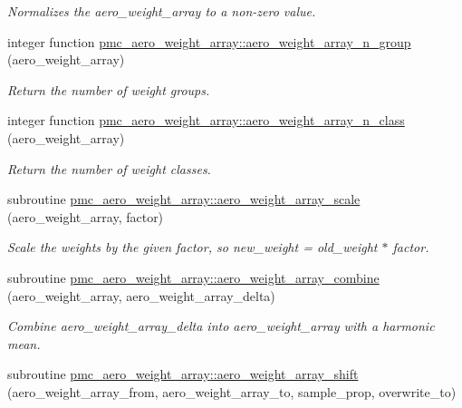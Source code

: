 \begin{DoxyCompactItemize}
\begin{DoxyCompactList}\small\item\em Normalizes the {\ttfamily aero\+\_\+weight\+\_\+array} to a non-\/zero value. \end{DoxyCompactList}\item 
integer function \mbox{\hyperlink{namespacepmc__aero__weight__array_ac03a66965bebb2e5b699f16acc021962}{pmc\+\_\+aero\+\_\+weight\+\_\+array\+::aero\+\_\+weight\+\_\+array\+\_\+n\+\_\+group}} (aero\+\_\+weight\+\_\+array)
\begin{DoxyCompactList}\small\item\em Return the number of weight groups. \end{DoxyCompactList}\item 
integer function \mbox{\hyperlink{namespacepmc__aero__weight__array_a51061757ff964272d7375d50a99d07a7}{pmc\+\_\+aero\+\_\+weight\+\_\+array\+::aero\+\_\+weight\+\_\+array\+\_\+n\+\_\+class}} (aero\+\_\+weight\+\_\+array)
\begin{DoxyCompactList}\small\item\em Return the number of weight classes. \end{DoxyCompactList}\item 
subroutine \mbox{\hyperlink{namespacepmc__aero__weight__array_a5ecd5778c018848c999ef89b28f5940f}{pmc\+\_\+aero\+\_\+weight\+\_\+array\+::aero\+\_\+weight\+\_\+array\+\_\+scale}} (aero\+\_\+weight\+\_\+array, factor)
\begin{DoxyCompactList}\small\item\em Scale the weights by the given factor, so {\ttfamily new\+\_\+weight = old\+\_\+weight $\ast$ factor}. \end{DoxyCompactList}\item 
subroutine \mbox{\hyperlink{namespacepmc__aero__weight__array_ac29cb102e3495fadc37eca9347b519b5}{pmc\+\_\+aero\+\_\+weight\+\_\+array\+::aero\+\_\+weight\+\_\+array\+\_\+combine}} (aero\+\_\+weight\+\_\+array, aero\+\_\+weight\+\_\+array\+\_\+delta)
\begin{DoxyCompactList}\small\item\em Combine {\ttfamily aero\+\_\+weight\+\_\+array\+\_\+delta} into {\ttfamily aero\+\_\+weight\+\_\+array} with a harmonic mean. \end{DoxyCompactList}\item 
subroutine \mbox{\hyperlink{namespacepmc__aero__weight__array_ab91ec24f000d4b6503e6817a84f2da11}{pmc\+\_\+aero\+\_\+weight\+\_\+array\+::aero\+\_\+weight\+\_\+array\+\_\+shift}} (aero\+\_\+weight\+\_\+array\+\_\+from, aero\+\_\+weight\+\_\+array\+\_\+to, sample\+\_\+prop, overwrite\+\_\+to)

\end{DoxyCompactItemize}
